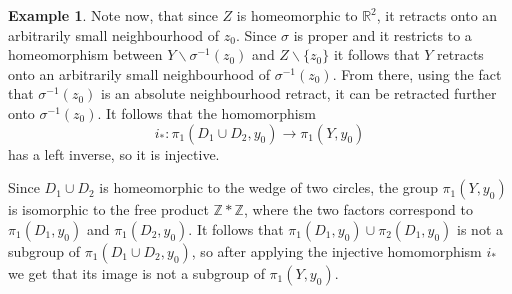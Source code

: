 \documentclass{article}
\theoremstyle{plain}
\theoremstyle{definition}
\newtheorem{ex}[thm]{Example}
\theoremstyle{remark}
\newcommand{\R}{\mathbb{R}}
\begin{document}
\begin{ex}
Note now, that since $Z$ is homeomorphic to $\R^2$, it retracts onto an arbitrarily small neighbourhood of $z_0$. Since $\sigma$ is proper and it restricts to a homeomorphism between $Y\backslash \sigma^{-1}(z_0)$ and $Z\backslash\{z_0\}$ it follows that $Y$ retracts onto an arbitrarily small neighbourhood of $\sigma^{-1}(z_0)$. From there, using the fact that $\sigma^{-1}(z_0)$ is an absolute neighbourhood retract, it can be retracted further onto $\sigma^{-1}(z_0)$. It follows that the homomorphism
\begin{equation*}
	i_\ast:\pi_1(D_1\cup D_2,y_0)\rightarrow \pi_1(Y,y_0)
\end{equation*}
has a left inverse, so it is injective. 

Since $D_1\cup D_2$ is homeomorphic to the wedge of two circles, the group $\pi_1(Y,y_0)$ is isomorphic to the free product $\mathbb Z\ast \mathbb Z$, where the two factors correspond to $\pi_1(D_1,y_0)$ and $\pi_1(D_2,y_0)$. It follows that $\pi_1(D_1,y_0)\cup \pi_2(D_1,y_0)$ is not a subgroup of $\pi_1(D_1\cup D_2,y_0)$, so after applying the injective homomorphism $i_\ast$ we get that its image is not a subgroup of $\pi_1(Y,y_0)$.
\end{ex}
\end{document}
